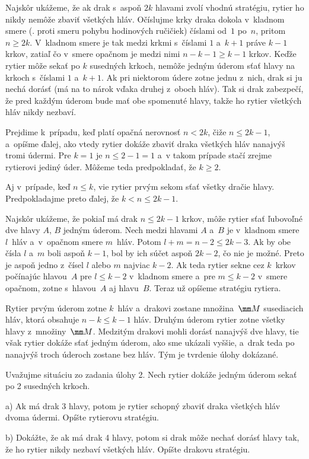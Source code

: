 {%
Najskôr ukážeme, že ak drak s~aspoň $2k$ hlavami zvolí vhodnú stratégiu, rytier
ho nikdy nemôže zbaviť všetkých hláv. Očíslujme krky draka dokola v~kladnom smere (\tj.
proti smeru pohybu hodinových ručičiek) číslami od~$1$ po~$n$,
pritom $n\ge 2k$. V~kladnom smere je tak medzi
krkmi s~číslami $1$ a~$k+1$ práve $k-1$ krkov, zatiaľ čo v~smere opačnom je medzi nimi
$n-k-1\ge k-1$ krkov. Keďže rytier môže sekať po $k$ susedných krkoch, nemôže jedným
úderom sťať hlavy na krkoch s~číslami $1$ a~$k+1$. Ak pri niektorom údere zotne jednu
z~nich, drak si ju nechá dorásť (má na to nárok vďaka druhej z~oboch
hláv). Tak si drak zabezpečí, že pred každým úderom bude mať obe
spomenuté hlavy, takže ho rytier všetkých hláv nikdy nezbaví.

Prejdime k~prípadu, keď platí opačná nerovnosť $n<2k$, čiže $n\le2k-1$,
a~opíšme ďalej, ako vtedy rytier dokáže zbaviť draka všetkých hláv nanajvýš tromi
údermi. Pre $k=1$ je $n\le2-1=1$ a~v takom prípade stačí zrejme rytierovi jediný
úder. Môžeme teda predpokladať, že $k\ge2$.

Aj v~prípade, keď $n\le k$, vie rytier prvým sekom sťať všetky dračie hlavy.
Predpokladajme preto ďalej, že $k<n\le2k-1$.

Najskôr ukážeme, že pokiaľ má drak $n\le 2k-1$
krkov, môže rytier sťať ľubovoľné dve hlavy $A$, $B$ jedným úderom. Nech medzi hlavami
$A$ a~$B$ je v~kladnom smere $l$~hláv a~v~opačnom smere
$m$~hláv. Potom $l+m=n-2\le 2k-3$. Ak by obe čísla $l$ a~$m$ boli aspoň
$k-1$, bol by ich súčet aspoň $2k-2$, čo nie je možné. Preto je aspoň jedno
z~čísel $l$ alebo $m$ najviac $k-2$. Ak teda rytier sekne cez $k$~krkov počínajúc
hlavou~$A$ pre $l\le k-2$ v~kladnom smere a~pre $m\le k-2$ v~smere opačnom,
zotne s~hlavou~$A$ aj hlavu~$B$. Teraz už opíšeme stratégiu rytiera.

Rytier prvým úderom zotne $k$~hláv a~drakovi zostane množina~$\mm M$ susediacich hláv,
ktorá obsahuje $n-k\le k-1$ hláv.
Druhým úderom rytier zotne všetky hlavy z~množiny~$\mm M$.
Medzitým drakovi mohli dorásť nanajvýš dve hlavy,
tie však rytier dokáže sťať jedným úderom, ako sme ukázali vyššie, a~drak teda
po nanajvýš troch úderoch zostane bez hláv. Tým je tvrdenie úlohy dokázané.

Uvažujme situáciu zo zadania úlohy 2. Nech rytier dokáže jedným úderom sekať po 2
susedných krkoch.
\item{a)} Ak má drak 3 hlavy, potom je rytier schopný zbaviť draka všetkých hláv dvoma
údermi. Opíšte rytierovu stratégiu.
\item{b)} Dokážte, že ak má drak 4 hlavy, potom si drak môže nechať dorásť hlavy
tak, že ho rytier nikdy nezbaví všetkých hláv. Opíšte drakovu stratégiu. 

}
